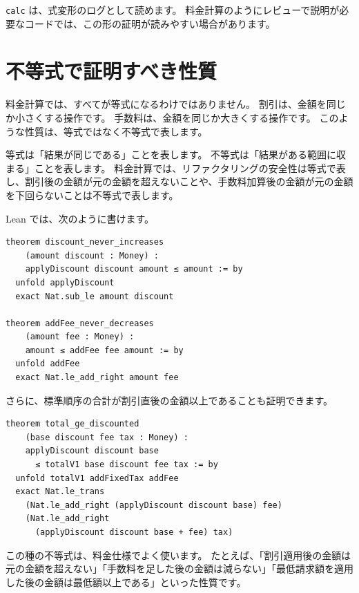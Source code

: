 \texttt{calc} は、式変形のログとして読めます。
料金計算のようにレビューで説明が必要なコードでは、この形の証明が読みやすい場合があります。

\section{不等式で証明すべき性質}

料金計算では、すべてが等式になるわけではありません。
割引は、金額を同じか小さくする操作です。
手数料は、金額を同じか大きくする操作です。
このような性質は、等式ではなく不等式で表します。

等式は「結果が同じである」ことを表します。
不等式は「結果がある範囲に収まる」ことを表します。
料金計算では、リファクタリングの安全性は等式で表し、割引後の金額が元の金額を超えないことや、手数料加算後の金額が元の金額を下回らないことは不等式で表します。

Lean では、次のように書けます。

\begin{listing}[htbp]
\begin{verbatim}
theorem discount_never_increases
    (amount discount : Money) :
    applyDiscount discount amount ≤ amount := by
  unfold applyDiscount
  exact Nat.sub_le amount discount

theorem addFee_never_decreases
    (amount fee : Money) :
    amount ≤ addFee fee amount := by
  unfold addFee
  exact Nat.le_add_right amount fee
\end{verbatim}
\caption{割引・手数料の上下界}
\label{lst:ch26-inequalities}
\end{listing}

さらに、標準順序の合計が割引直後の金額以上であることも証明できます。

\begin{listing}[htbp]
\begin{verbatim}
theorem total_ge_discounted
    (base discount fee tax : Money) :
    applyDiscount discount base
      ≤ totalV1 base discount fee tax := by
  unfold totalV1 addFixedTax addFee
  exact Nat.le_trans
    (Nat.le_add_right (applyDiscount discount base) fee)
    (Nat.le_add_right
      (applyDiscount discount base + fee) tax)
\end{verbatim}
\caption{\texttt{total\_ge\_discounted}}
\label{lst:ch26-total-ge-discounted}
\end{listing}

この種の不等式は、料金仕様でよく使います。
たとえば、「割引適用後の金額は元の金額を超えない」「手数料を足した後の金額は減らない」「最低請求額を適用した後の金額は最低額以上である」といった性質です。

